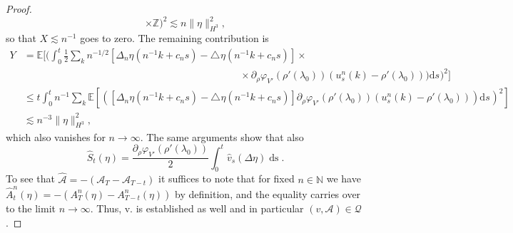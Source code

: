 \documentclass[11pt, a4paper]{article}
\newcommand{\mathd}{\mathrm{d}}
\newcommand{\tmop}[1]{\ensuremath{\operatorname{#1}}}
\newcommand{\CL}{\mathcal{L}}
\newcommand{\1}{\mathbf{1}}
\begin{document}
\begin{proof}
\[{     \times \mathbb{Z})}^2 \lesssim n \| \eta \|_{H^3}^2, \]
  so that $X \lesssim n^{- 1}$ goes to zero. The remaining contribution is
  \begin{align*}
     Y & =\mathbb{E} \Big[ \Big( \int_0^t \frac{1}{2} \sum_k n^{- 1 / 2} [\Delta_n \eta (n^{- 1} k + c_n s) - \triangle_{} \eta (n^{- 1} k + c_n s)] \times \\
     &\hspace{260pt} \times \partial_{\rho} \varphi_{V'} (\rho' (\lambda_0)) (u_s^n (k) - \rho' (\lambda_0))) \mathd s^{} \Big)^2 \Big] \\
     & \leqslant t \int_0^t n^{- 1} \sum_k \mathbb{E} \left[ \left( [\Delta_n
     \eta (n^{- 1} k + c_n s) - \triangle_{} \eta (n^{- 1} k + c_n s)] \left.
     \partial_{\rho} \varphi_{V'} (\rho' (\lambda_0)) (u_s^n (k) - \rho'
     (\lambda_0)) \right) \mathd s^{} \right)^2 \right] \\
     & \lesssim n^{- 3} \| \eta \|_{H^3}^2,
  \end{align*}
  which also vanishes for $n \rightarrow \infty$. The same arguments show that
  also
  \[ \hat{S}_t (\eta) = \frac{\partial_{\rho} \varphi_{V'} (\rho'
     (\lambda_0))}{2} \int_{0^{}}^t \hat{v}_s (\Delta \eta) \tmop{ds}. \]
   To see that
  $\hat{\mathcal{A}} = - (\mathcal{A}_T -\mathcal{A}_{T - t})$ it suffices to
  note that for fixed $n \in \mathbb{N}$ we have $\hat{A}^n_t (\eta) = - (A^n_T (\eta) - A^n_{T - t} (\eta))$ by definition, and the equality carries over to the limit $n\to \infty$. 
  Thus, v. is established as well and in particular $(v, \mathcal{A}) \in
  \mathcal{Q}$.
  

\end{proof}
\end{document}
